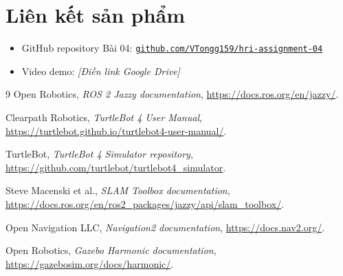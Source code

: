 \documentclass[12pt,a4paper]{article}
\begin{document}
\section*{Liên kết sản phẩm}

\begin{itemize}
  \item GitHub repository Bài 04:
    \href{https://github.com/VTongg159/hri-assignment-04}
    {\texttt{github.com/VTongg159/hri-assignment-04}}
  \item Video demo: \textit{[Điền link Google Drive]}
\end{itemize}

\begin{thebibliography}{9}
  Open Robotics, \emph{ROS 2 Jazzy documentation},
  \url{https://docs.ros.org/en/jazzy/}.

  Clearpath Robotics, \emph{TurtleBot 4 User Manual},
  \url{https://turtlebot.github.io/turtlebot4-user-manual/}.

  TurtleBot, \emph{TurtleBot 4 Simulator repository},
  \url{https://github.com/turtlebot/turtlebot4_simulator}.

  Steve Macenski et al., \emph{SLAM Toolbox documentation},
  \url{https://docs.ros.org/en/ros2_packages/jazzy/api/slam_toolbox/}.

  Open Navigation LLC, \emph{Navigation2 documentation},
  \url{https://docs.nav2.org/}.

  Open Robotics, \emph{Gazebo Harmonic documentation},
  \url{https://gazebosim.org/docs/harmonic/}.
\end{thebibliography}
\end{document}
